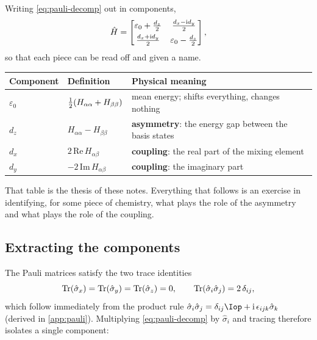 \noindent
Writing \cref{eq:pauli-decomp} out in components,
%
\begin{equation}
\hat{H} =
\begin{bmatrix}
\varepsilon_0 + \tfrac{d_z}{2} & \tfrac{d_x - \mathrm{i} d_y}{2}\\[4pt]
\tfrac{d_x + \mathrm{i} d_y}{2} & \varepsilon_0 - \tfrac{d_z}{2}
\end{bmatrix},
\label{eq:pauli-components}
\end{equation}
%
so that each piece can be read off and given a name.

\begin{center}
\small
\begin{tabular}{@{}lll@{}}
\toprule
Component & Definition & Physical meaning \\
\midrule
$\varepsilon_0$ & $\tfrac{1}{2}(H_{\alpha\alpha}+H_{\beta\beta})$
  & mean energy; shifts everything, changes nothing \\
$d_z$ & $H_{\alpha\alpha}-H_{\beta\beta}$
  & \textbf{asymmetry}: the energy gap between the basis states \\
$d_x$ & $2\,\mathrm{Re}\,H_{\alpha\beta}$
  & \textbf{coupling}: the real part of the mixing element \\
$d_y$ & $-2\,\mathrm{Im}\,H_{\alpha\beta}$
  & \textbf{coupling}: the imaginary part \\
\bottomrule
\end{tabular}
\end{center}

That table is the thesis of these notes. Everything that follows is an exercise in
identifying, for some piece of chemistry, what plays the role of the asymmetry and what
plays the role of the coupling.

\subsection{Extracting the components}

The Pauli matrices satisfy the two trace identities
%
\begin{equation}
\operatorname{Tr}\!\left(\hat{\sigma}_x\right)=\operatorname{Tr}\!\left(\hat{\sigma}_y\right)=\operatorname{Tr}\!\left(\hat{\sigma}_z\right)=0,
\qquad
\operatorname{Tr}\!\left(\hat\sigma_i\hat\sigma_j\right) = 2\,\delta_{ij},
\label{eq:traces}
\end{equation}
%
which follow immediately from the product rule
$\hat\sigma_i\hat\sigma_j = \delta_{ij}\Iop + \ii\,\epsilon_{ijk}\hat\sigma_k$
(derived in \cref{app:pauli}). Multiplying \cref{eq:pauli-decomp} by $\hat\sigma_i$ and
tracing therefore isolates a single component:

